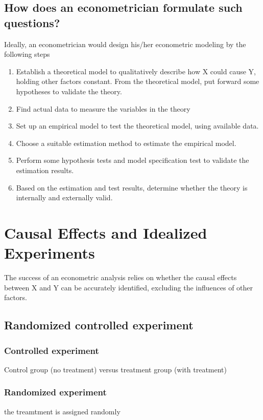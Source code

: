 \documentclass[a4paper,11pt]{article}
\begin{document}
\subsection{How does an econometrician formulate such questions?}
\label{sec:org5b05299}

Ideally, an econometrician would design his/her econometric modeling
by the following steps

\begin{enumerate}
\item Establish a theoretical model to qualitatively describe how X could
cause Y, holding other factors constant. From the theoretical
model, put forward some hypotheses to validate the theory.
\item Find actual data to measure the variables in the theory
\item Set up an empirical model to test the theoretical model, using
available data.
\item Choose a suitable estimation method to estimate the empirical model.
\item Perform some hypothesis tests and model specification test to
validate the estimation results.
\item Based on the estimation and test results, determine whether the theory
is internally and externally valid.
\end{enumerate}


\section{Causal Effects and Idealized Experiments}
\label{sec:org5c01698}

The success of an econometric analysis relies on whether the causal
effects between X and Y can be accurately identified, excluding the
influences of other factors.

\subsection{Randomized controlled experiment}
\label{sec:org3b943c0}

\subsubsection*{Controlled experiment}
\label{sec:orgbbdadb3}

Control group (no treatment) versus treatment group (with treatment)

\subsubsection*{Randomized experiment}
\label{sec:org6c458a7}
the treamtment is assigned randomly
\end{document}
